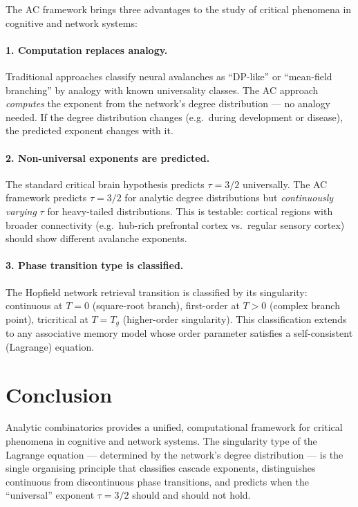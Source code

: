 \documentclass[11pt,a4paper]{article}
\theoremstyle{definition}
\begin{document}
The AC framework brings three advantages to the study of critical
phenomena in cognitive and network systems:

\paragraph{1. Computation replaces analogy.}
Traditional approaches classify neural avalanches as ``DP-like'' or
``mean-field branching'' by analogy with known universality classes.
The AC approach \emph{computes} the exponent from the network's degree
distribution --- no analogy needed. If the degree distribution changes
(e.g.\ during development or disease), the predicted exponent changes
with it.

\paragraph{2. Non-universal exponents are predicted.}
The standard critical brain hypothesis predicts $\tau = 3/2$ universally.
The AC framework predicts $\tau = 3/2$ for analytic degree distributions
but \emph{continuously varying} $\tau$ for heavy-tailed distributions.
This is testable: cortical regions with broader connectivity (e.g.\
hub-rich prefrontal cortex vs.\ regular sensory cortex) should show
different avalanche exponents.

\paragraph{3. Phase transition type is classified.}
The Hopfield network retrieval transition is classified by its
singularity: continuous at $T = 0$ (square-root branch), first-order at
$T > 0$ (complex branch point), tricritical at $T = T_g$ (higher-order
singularity). This classification extends to any associative memory
model whose order parameter satisfies a self-consistent (Lagrange)
equation.


\section{Conclusion}
\label{sec:conclusion}

Analytic combinatorics provides a unified, computational framework for
critical phenomena in cognitive and network systems. The singularity type
of the Lagrange equation --- determined by the network's degree
distribution --- is the single organising principle that classifies
cascade exponents, distinguishes continuous from discontinuous phase
transitions, and predicts when the ``universal'' exponent $\tau = 3/2$
should and should not hold.
\end{document}
